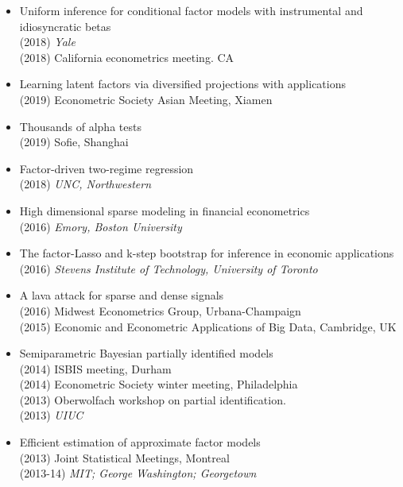 \documentclass[11pt]{article}
\begin{document}
\begin{itemize}
 
\item Uniform inference for conditional factor models with instrumental and idiosyncratic betas \hfill\\
(2018) \textit{Yale } \\
(2018) California econometrics meeting. CA
 

\item Learning latent factors via diversified projections with applications 
\hfill\\
(2019) Econometric Society Asian Meeting, Xiamen


\item Thousands of alpha tests
\hfill\\
(2019) Sofie, Shanghai


\item Factor-driven two-regime regression \hfill\\
(2018) \textit{UNC, Northwestern} 

\item High dimensional sparse modeling in financial econometrics \hfill\\
(2016) \textit{Emory, Boston University} 


\item The factor-Lasso and k-step bootstrap   for inference in economic applications \hfill\\
   (2016)  \textit{Stevens Institute of Technology, University of Toronto}
   




  \item A lava attack for sparse and dense signals \hfill\\
     (2016) Midwest Econometrics Group, Urbana-Champaign \\
   (2015) Economic and Econometric Applications of Big Data, Cambridge, UK
   
   
  \item Semiparametric Bayesian partially identified models \hfill\\
(2014)   ISBIS meeting, Durham\\
(2014) Econometric Society winter meeting, Philadelphia\\
(2013)   Oberwolfach workshop on partial identification.\\
(2013) \textit{UIUC}

  \item Efficient estimation of approximate factor models \hfill\\
(2013) Joint Statistical Meetings, Montreal\\
(2013-14)  \textit{MIT; George Washington;  Georgetown}



\end{itemize}
\end{document}
